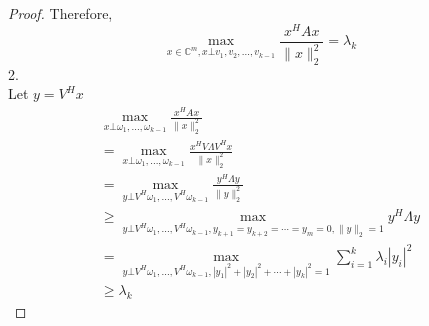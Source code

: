 \begin{multicols}{2}
\begin{proof}
    Therefore, 
    \[
        \underset{x\in\mathbb{C}^m,x\bot v_1,v_2,...,v_{k-1}}{\max} \frac{x^HAx}{\|x\|_2^2} = \lambda_k
    \]
    2. \\
    Let $y=V^Hx$
    \[
        \begin{array}{l}
            \underset{x\bot \omega_1,...,\omega_{k-1}}{\max} \frac{x^HAx}{\|x\|_2^2} \\
            = \underset{x\bot \omega_1,...,\omega_{k-1}}{\max} \frac{x^HV\Lambda V^H x}{\|x\|_2^2} \\
            = \underset{y\bot V^H\omega_1,...,V^H\omega_{k-1}}{\max} \frac{y^H\Lambda y}{\|y\|_2^2} \\
            \geq \underset{y\bot V^H\omega_1,...,V^H\omega_{k-1},y_{k+1}=y_{k+2}=\cdots=y_{m}=0,\|y\|_2=1}{\max} y^H\Lambda y \\
            = \underset{y\bot V^H\omega_1,...,V^H\omega_{k-1},|y_1|^2+|y_2|^2+\cdots+|y_k|^2=1}{\max} \sum_{i=1}^k \lambda_i|y_i|^2 \\
            \geq \lambda_k 
        \end{array}
    \]

\end{proof}


\end{multicols}
